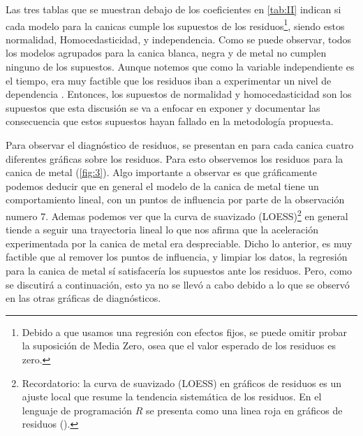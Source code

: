 \documentclass[12pt,a4paper]{config/myConfig}
\begin{document}
\indent Las tres tablas que se muestran debajo de los coeficientes en \cref{tab:II} indican si cada modelo para la canicas cumple los supuestos de los residuos\footnote{Debido a que usamos una regresión con efectos fijos, se puede omitir probar la suposición de Media Zero, osea que el valor esperado de los residuos es zero.}, siendo estos normalidad, Homocedasticidad, y independencia. Como se puede observar, todos los modelos agrupados para la canica blanca, negra y de metal no cumplen ninguno de los supuestos. Aunque notemos que como la variable independiente es el tiempo, era muy factible que los residuos iban a experimentar un nivel de dependencia \citet{christensen2020analysis}. Entonces, los supuestos de normalidad y homocedasticidad son los supuestos que esta discusión se va a enfocar en exponer y documentar las consecuencia que estos supuestos hayan fallado en la metodología propuesta.\newline

\indent Para observar el diagnóstico de residuos, se presentan en  para cada canica cuatro diferentes gráficas sobre los residuos. Para esto observemos los residuos para la canica de metal (\cref{fig:3}). Algo importante a observar es que gráficamente podemos deducir que en general el modelo de la canica de metal tiene un comportamiento lineal, con un puntos de influencia por parte de la observación numero 7. Ademas podemos ver que la curva de suavizado (LOESS)\footnote{Recordatorio: la curva de suavizado (LOESS) en gráficos de residuos es un ajuste local que resume la tendencia sistemática de los residuos. En el lenguaje de programación $R$ se presenta como una linea roja en gráficos de residuos (\cite{christensen2020analysis}).} en general tiende a seguir una trayectoria lineal lo que nos afirma que la aceleración experimentada por la canica de metal era despreciable. Dicho lo anterior, es muy factible que al remover los puntos de influencia, y limpiar los datos, la regresión para la canica de metal sí satisfacería los supuestos ante los residuos. Pero, como se discutirá a continuación, esto ya no se llevó a cabo debido a lo que se observó en las otras gráficas de diagnósticos.\newline
\end{document}
